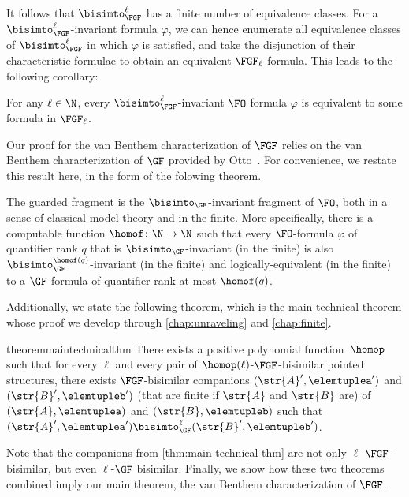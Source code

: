 It follows that $\bisimto_{\FGF}^{\ell}$ has a finite number of equivalence classes.
For a $\bisimto_{\FGF}^{\ell}$-invariant formula $\varphi$, we can hence enumerate all equivalence classes of $\bisimto_{\FGF}^{\ell}$ in which $\varphi$ is satisfied, and take the disjunction of their characteristic formulae to obtain an equivalent $\FGF_{\ell}$ formula.
This leads to the following corollary:
\begin{corollary}\label{cor:ell-invariant-has-ell-formula}
  For any $\ell \in \N$, every $\bisimto_{\FGF}^{\ell}$-invariant $\FO$ formula $\varphi$ is equivalent to some formula in $\FGF_{\ell}$.
\end{corollary}

\noindent
Our proof for the van Benthem characterization of $\FGF$ relies on the van Benthem characterization of $\GF$ provided by Otto~\cite{Otto2012}.
For convenience, we restate this result here, in the form of the folowing theorem.
\begin{theorem}\label{thm:vanBenthem-for-GF}
  The guarded fragment is the $\bisimto_{\GF}$-invariant fragment of $\FO$, both in a sense of classical model theory and in the finite.
  More specifically, there is a computable function $\homof \colon \N \to \N$ such that every $\FO$-formula $\varphi$ of quantifier rank $q$ that is $\bisimto_{\GF}$-invariant (in the finite) is also $\bisimto^{\homof(q)}_{\GF}$-invariant (in the finite) and logically-equivalent (in the finite) to a $\GF$-formula of quantifier rank at most $\homof(q)$.
\end{theorem}
Additionally, we state the following theorem, which is the main technical theorem whose proof we develop through \cref{chap:unraveling} and \cref{chap:finite}.
\begin{restatable*}{theorem}{maintechnicalthm}\label{thm:main-technical-thm}
  There exists a positive polynomial function~$\homop$ such that for every $\ell$ and every pair of $\homop(\ell)$-$\FGF$-bisimilar pointed structures, there exists $\FGF$-bisimilar companions $(\str{A}', \elemtuplea')$ and $(\str{B}', \elemtupleb')$ (that are finite if $\str{A}$ and $\str{B}$ are) of $(\str{A}, \elemtuplea)$ and $(\str{B}, \elemtupleb)$ such that $(\str{A}', \elemtuplea') \bisimto^{\ell}_{\GF} (\str{B}', \elemtupleb')$.
\end{restatable*}

\noindent
Note that the companions from \cref{thm:main-technical-thm} are not only $\ell$-$\FGF$-bisimilar, but even $\ell$-$\GF$ bisimilar. Finally, we show how these two theorems combined imply our main theorem, the van Benthem characterization of $\FGF$.

